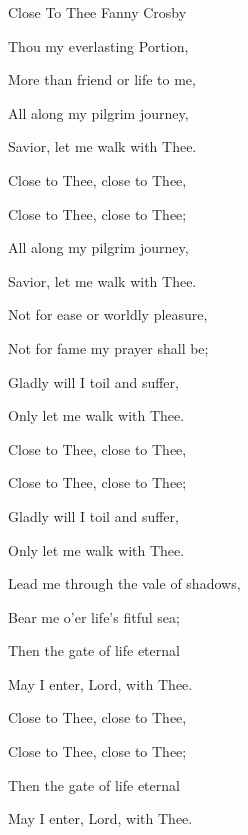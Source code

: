 \documentclass[12pt]{book}
\begin{document}
\begin{song}{Close To Thee}{}
  {\SBPubDom}
  {Fanny Crosby}
  {}
  {}

  \begin{SBVerse}
    Thou my everlasting Portion,

    More than friend or life to me,

    All along my pilgrim journey,

    Savior, let me walk with Thee.
  \end{SBVerse}

  \begin{SBOpGroup}
    Close to Thee, close to Thee,

    Close to Thee, close to Thee;

    All along my pilgrim journey,

    Savior, let me walk with Thee.
  \end{SBOpGroup}

  \begin{SBVerse}
    Not for ease or worldly pleasure,

    Not for fame my prayer shall be;

    Gladly will I toil and suffer,

    Only let me walk with Thee.
  \end{SBVerse}

  \begin{SBOpGroup}
    Close to Thee, close to Thee,

    Close to Thee, close to Thee;

    Gladly will I toil and suffer,

    Only let me walk with Thee.
  \end{SBOpGroup}

  \begin{SBVerse}
    Lead me through the vale of shadows,

    Bear me o'er life's fitful sea;

    Then the gate of life eternal

    May I enter, Lord, with Thee.
  \end{SBVerse}

  \begin{SBOpGroup}
    Close to Thee, close to Thee,

    Close to Thee, close to Thee;

    Then the gate of life eternal

    May I enter, Lord, with Thee.
  \end{SBOpGroup}
\end{song}
\end{document}
